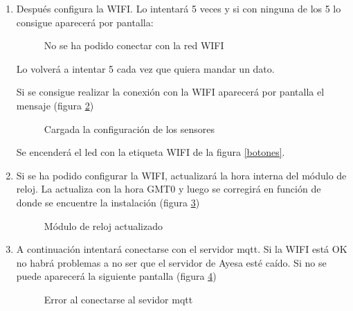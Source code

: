 \begin{enumerate}
\newpage
\item Después configura la WIFI. Lo intentará 5 veces y si con ninguna de los 5 lo consigue aparecerá por pantalla:

\begin{figure}[htbp!] 
\caption{No se ha podido conectar con la red WIFI}\label{patalla:wifiError} 
\end{figure}

Lo volverá a intentar 5 cada vez que quiera mandar un dato.

Si se consigue realizar la conexión con la WIFI aparecerá por pantalla el mensaje (figura \ref{patalla:WifiOk})

\begin{figure}[htbp!] 
\caption{Cargada la configuración de los sensores}\label{patalla:WifiOk} 
\end{figure}

Se encenderá el led con la etiqueta WIFI de la figura \ref{botones}.


\item Si se ha podido configurar la WIFI, actualizará la hora interna del módulo de reloj. La actualiza con la hora GMT0 y luego se corregirá en función de donde se encuentre la instalación (figura \ref{patalla:relojOK})

\begin{figure}[htbp!] 
\caption{Módulo de reloj actualizado}\label{patalla:relojOK} 
\end{figure}



\item A continuación intentará conectarse con el servidor mqtt. Si la WIFI está OK no habrá problemas a no ser que el servidor de Ayesa esté caído. Si no se puede aparecerá la siguiente pantalla (figura \ref{patalla:mqttError})

\begin{figure}[htbp!] 
\caption{Error al conectarse al sevidor mqtt}\label{patalla:mqttError} 
\end{figure}


\end{enumerate}
